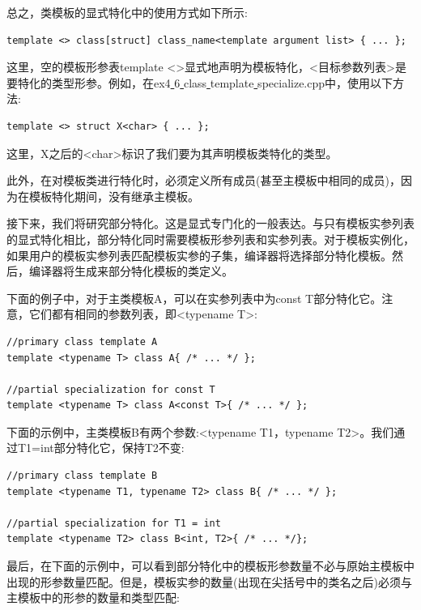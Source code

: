 总之，类模板的显式特化中的使用方式如下所示: \par

\begin{lstlisting}[caption={}]
template <> class[struct] class_name<template argument list> { ... };
\end{lstlisting}

这里，空的模板形参表template <>显式地声明为模板特化，<目标参数列表>是要特化的类型形参。例如，在ex4\underline{ }6\underline{ }class\underline{ }template\underline{ }specialize.cpp中，使用以下方法: \par

\begin{lstlisting}[caption={}]
template <> struct X<char> { ... };
\end{lstlisting}

这里，X之后的<char>标识了我们要为其声明模板类特化的类型。\par
此外，在对模板类进行特化时，必须定义所有成员(甚至主模板中相同的成员)，因为在模板特化期间，没有继承主模板。 \par
接下来，我们将研究部分特化。这是显式专门化的一般表达。与只有模板实参列表的显式特化相比，部分特化同时需要模板形参列表和实参列表。对于模板实例化，如果用户的模板实参列表匹配模板实参的子集，编译器将选择部分特化模板。然后，编译器将生成来部分特化模板的类定义。 \par
下面的例子中，对于主类模板A，可以在实参列表中为const T部分特化它。注意，它们都有相同的参数列表，即<typename T>: \par

\begin{lstlisting}[caption={}]
//primary class template A
template <typename T> class A{ /* ... */ };

//partial specialization for const T
template <typename T> class A<const T>{ /* ... */ };
\end{lstlisting}

下面的示例中，主类模板B有两个参数:<typename T1，typename T2>。我们通过T1=int部分特化它，保持T2不变: \par

\begin{lstlisting}[caption={}]
//primary class template B
template <typename T1, typename T2> class B{ /* ... */ };

//partial specialization for T1 = int
template <typename T2> class B<int, T2>{ /* ... */};
\end{lstlisting}

最后，在下面的示例中，可以看到部分特化中的模板形参数量不必与原始主模板中出现的形参数量匹配。但是，模板实参的数量(出现在尖括号中的类名之后)必须与主模板中的形参的数量和类型匹配: \par

